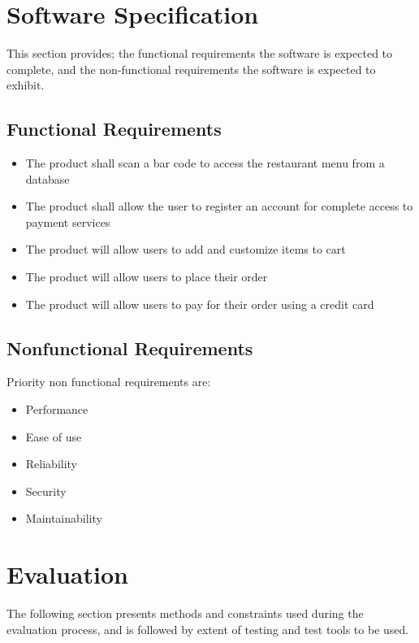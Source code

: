 \documentclass[12pt]{article}
\begin{document}
%
%

\section{ Software Specification}
This section provides; the functional requirements the 
software is expected to complete, and the non-functional requirements the software is expected to exhibit.

\subsection{Functional Requirements}

\noindent
\begin{itemize}
\item The product shall scan a bar code to access the restaurant menu from a database
\item The product shall allow the user to register an account for complete access to payment services
\item The product will allow users to add and customize items to cart
\item The product will allow users to place their order
\item The product will allow users to pay for their order using a credit card
\end{itemize}  

\subsection{Nonfunctional Requirements}
Priority non functional requirements are:
\begin{itemize}
\item Performance
\item Ease of use
\item Reliability
\item Security
\item Maintainability
\end{itemize} 
%
%

\section{Evaluation}

The following section presents methods and constraints used during the evaluation process, and is followed by extent of testing and test tools to be used.
\end{document}
